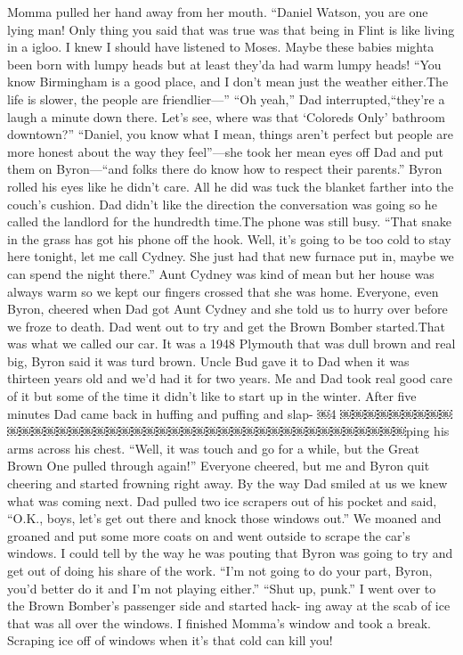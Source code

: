 \documentclass{standard}
\begin{document}
Momma pulled her hand away from her mouth. “Daniel Watson, you are one lying man! Only thing you said that was true was that being in Flint is like living in a igloo. I knew I should have listened to Moses. Maybe these babies mighta been born with lumpy heads but at least they’da had warm lumpy heads!
“You know Birmingham is a good place, and I don’t mean just the weather either.The life is slower, the people are friendlier—”
“Oh yeah,” Dad interrupted,“they’re a laugh a minute down there. Let’s see, where was that ‘Coloreds Only’ bathroom downtown?”
“Daniel, you know what I mean, things aren’t perfect but people are more honest about the way they feel”—she took her mean eyes off Dad and put them on Byron—“and folks there do know how to respect their parents.”
Byron rolled his eyes like he didn’t care. All he did was tuck the blanket farther into the couch’s cushion.
Dad didn’t like the direction the conversation was going so he called the landlord for the hundredth time.The phone was still busy.
“That snake in the grass has got his phone off the hook. Well, it’s going to be too cold to stay here tonight, let me call Cydney. She just had that new furnace put in, maybe we can spend the night there.” Aunt Cydney was kind of mean but her house was always warm so we kept our fingers crossed that she was home.
Everyone, even Byron, cheered when Dad got Aunt Cydney and she told us to hurry over before we froze to death.
Dad went out to try and get the Brown Bomber started.That was what we called our car. It was a 1948 Plymouth that was dull brown and real big, Byron said it was turd brown. Uncle Bud gave it to Dad when it was thirteen years old and we’d had it for two years. Me and Dad took real good care of it but some of the time it didn’t like to start up in the winter.
After five minutes Dad came back in huffing and puffing and slap-
￼4
￼￼￼￼￼￼￼￼￼￼￼￼￼￼￼￼￼￼￼￼￼￼￼￼￼￼￼￼￼￼￼￼￼￼￼￼￼￼￼￼￼ping his arms across his chest.
“Well, it was touch and go for a while, but the Great Brown One
pulled through again!” Everyone cheered, but me and Byron quit cheering and started frowning right away. By the way Dad smiled at us we knew what was coming next. Dad pulled two ice scrapers out of his pocket and said, “O.K., boys, let’s get out there and knock those windows out.”
We moaned and groaned and put some more coats on and went outside to scrape the car’s windows. I could tell by the way he was pouting that Byron was going to try and get out of doing his share of the work.
“I’m not going to do your part, Byron, you’d better do it and I’m not playing either.”
“Shut up, punk.”
I went over to the Brown Bomber’s passenger side and started hack- ing away at the scab of ice that was all over the windows. I finished Momma’s window and took a break. Scraping ice off of windows when it’s that cold can kill you!
\end{document}
